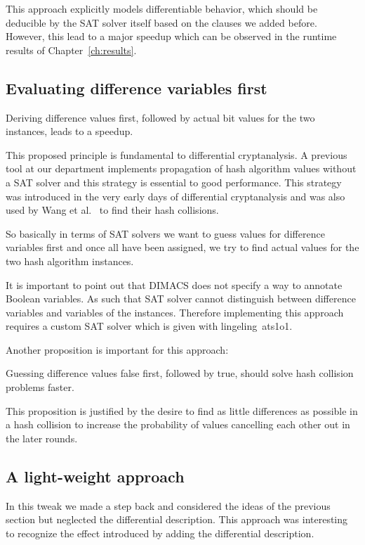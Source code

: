 This approach explicitly models differentiable behavior, which should be deducible
by the SAT solver itself based on the clauses we added before.
However, this lead to a major speedup which can be observed in the runtime results
of Chapter~\ref{ch:results}.

\newpage
\subsection{Evaluating difference variables first}
\label{sec:enc-diff-desc-ocnf}
%
\begin{prop}
  Deriving difference values first, followed by actual bit values for the two instances,
  leads to a speedup.
\end{prop}

This proposed principle is fundamental to differential cryptanalysis. A previous tool
at our department implements propagation of hash algorithm values without a SAT solver
and this strategy is essential to good performance. This strategy was introduced
in the very early days of differential cryptanalysis and was also used by Wang et
al.~\cite{wang2004} to find their hash collisions.

So basically in terms of SAT solvers we want to guess values for difference variables
first and once all have been assigned, we try to find actual values for the two
hash algorithm instances.

It is important to point out that DIMACS does not specify a way to annotate Boolean
variables. As such that SAT solver cannot distinguish between difference variables
and variables of the instances. Therefore implementing this approach requires a custom
SAT solver which is given with lingeling~ats1o1.

Another proposition is important for this approach:

\begin{prop}
  \label{prop:false-first}
  Guessing difference values false first, followed by true,
  should solve hash collision problems faster.
\end{prop}

This proposition is justified by the desire to find as little differences as possible
in a hash collision to increase the probability of values cancelling each other out
in the later rounds.

\subsection{A light-weight approach}
\label{sec:enc-ocnf}
%
In this tweak we made a step back and considered the ideas of the previous
section but neglected the differential description. This approach was interesting
to recognize the effect introduced by adding the differential description.

